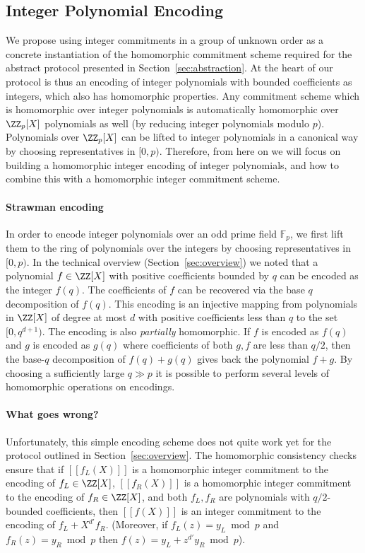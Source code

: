 \subsection{Integer Polynomial Encoding}

\label{sec:encoding}
We propose using integer commitments in a group of unknown order as a concrete instantiation of the homomorphic commitment scheme required for the abstract protocol presented in Section~\ref{sec:abstraction}. At the heart of our protocol is thus an encoding of integer polynomials with bounded coefficients as integers, which also has homomorphic properties. Any commitment scheme which is homomorphic over integer polynomials is automatically homomorphic over $\ZZ_p[X]$ polynomials as well (by reducing integer polynomials modulo $p$). Polynomials over $\ZZ_p[X]$ can be lifted to integer polynomials in a canonical way by choosing representatives in $[0,p)$. Therefore, from here on we will focus on building a homomorphic integer encoding of integer polynomials, and how to combine this with a homomorphic integer commitment scheme. 

\paragraph{Strawman encoding} In order to encode integer polynomials over an odd prime field $\mathbb{F}_p$, we first lift them to the ring of polynomials over the integers by choosing representatives in $[0,p)$. In the technical overview (Section~\ref{sec:overview}) we noted that a polynomial $f \in \ZZ[X]$ with positive coefficients bounded by $q$ can be encoded as the integer $f(q)$.   
The coefficients of $f$ can be recovered via the base $q$ decomposition of $f(q)$. 
This encoding is an injective mapping from polynomials in $\ZZ[X]$ of degree at most $d$ with positive coefficients less than $q$ to the set $[0, q^{d+1})$. The encoding is also \emph{partially} homomorphic. 
If $f$ is encoded as $f(q)$ and $g$ is encoded as $g(q)$ where coefficients of both $g, f$ are less than $q/2$, then the base-$q$ decomposition of $f(q) + g(q)$ gives back the polynomial $f + g$. 
By choosing a sufficiently large $q \gg p$ it is possible to perform several levels of homomorphic operations on encodings. 

\paragraph{What goes wrong?} Unfortunately, this simple encoding scheme does not quite work yet for the protocol outlined in Section~\ref{sec:overview}. The homomorphic consistency checks ensure that if $[\![f_L(X)]\!]$ is a homomorphic integer commitment to the encoding of $f_L \in \ZZ[X]$, $[\![f_R(X)]\!]$ is a homomorphic integer commitment to the encoding of $f_R \in \ZZ[X]$, and both $f_L, f_R$ are polynomials with $q/2$-bounded coefficients, then $[\![f(X)]\!]$ is an integer commitment to the encoding of $f_L + X^{d'}f_R$. (Moreover, if $f_L(z) = y_L \bmod p$ and $f_R(z) = y_R \bmod p$ then $f(z) = y_L + z^{d'} y_R \bmod p$). 

